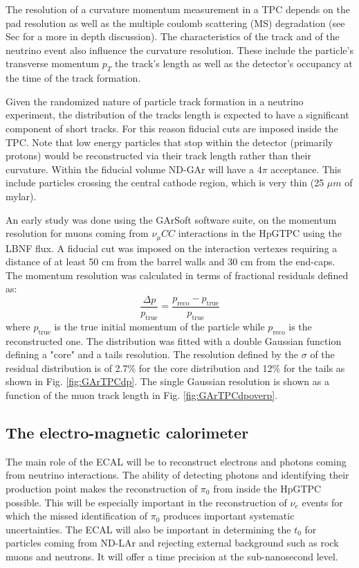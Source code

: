 The resolution of a curvature momentum measurement in a TPC depends on the pad resolution as well as the multiple coulomb scattering (MS) degradation (see Sec for a more in depth discussion). The characteristics of the track and of the neutrino event also influence the curvature resolution. These include the particle's transverse momentum $p_T$ the track's length as well as the detector's occupancy at the time of the track formation.

Given the randomized nature of particle track formation in a neutrino experiment, the distribution of the tracks length is expected to have a significant component of short tracks. For this reason fiducial cuts are imposed inside the TPC. Note that low energy particles that stop within the detector (primarily protons) would be reconstructed via their track length rather than their curvature. Within the fiducial volume ND-GAr will have a $4\pi$ acceptance. This include particles crossing the central cathode region, which is very thin (25 $\mu m$ of mylar).

An early study was done using the GArSoft software suite, on the momentum resolution for muons coming from $\nu_\mu CC$ interactions in the HpGTPC using the LBNF flux. A fiducial cut was imposed on the interaction vertexes requiring a distance of at least 50 cm from the barrel walls and 30 cm from the end-caps. The momentum resolution was calculated in terms of fractional residuals defined as:
    \begin{equation}
        \frac{\Delta p}{p_\textrm{true}} = \frac{p_\textrm{reco}-p_\textrm{true}}{p_\textrm{true}}
    \end{equation}
where $p_\textrm{true}$ is the true initial momentum of the particle while $p_\textrm{reco}$ is the reconstructed one. The distribution was fitted with a double Gaussian function defining a "core" and a tails resolution. The resolution defined by the $\sigma$ of the residual distribution is of 2.7\% for the core distribution and 12\% for the tails as shown in Fig. \ref{fig:GArTPCdp}. The single Gaussian resolution is shown as a function of the muon track length in Fig. \ref{fig:GArTPCdpoverp}.

\subsection{The electro-magnetic calorimeter}
The main role of the ECAL will be to reconstruct electrons and photons coming from neutrino interactions. The ability of detecting photons and identifying their production point makes the reconstruction of $\pi_0$ from inside the HpGTPC possible. This will be especially important in the reconstruction of $\nu_e$ events for which the missed identification of $\pi_0$ produces important systematic uncertainties. The ECAL will also be important in determining the $t_0$ for particles coming from ND-LAr and rejecting external background such as rock muons and neutrons. It will offer a time precision at the sub-nanosecond level.


